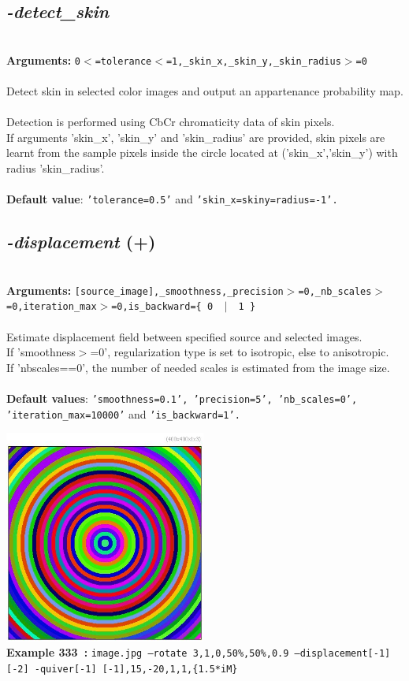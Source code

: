 \documentclass[a4paper,11pt,twoside]{book}
\begin{document}
\subsection{\emph{-detect\_skin} }\vspace*{-0.5em}
~\\\textbf{Arguments: } 
{\small \texttt{0$<$=tolerance$<$=1,\_skin\_x,\_skin\_y,\_skin\_radius$>$=0}}\\~\\
Detect skin in selected color images and output an appartenance probability map.
~\\Detection is performed using CbCr chromaticity data of skin pixels.
~\\If arguments 'skin\_x', 'skin\_y' and 'skin\_radius' are provided, skin pixels are learnt
from the sample pixels inside the circle located at ('skin\_x','skin\_y') with radius 'skin\_radius'.
~\\~\\\textbf{Default value}: {\small \texttt{'tolerance=0.5'} and \texttt{'skin\_x=skiny=radius=-1'.}}


\subsection{\emph{-displacement} (+)}\vspace*{-0.5em}
~\\\textbf{Arguments: } 
{\small \texttt{[source\_image],\_smoothness,\_precision$>$=0,\_nb\_scales$>$=0,iteration\_max$>$=0,is\_backward=\{ 0 ~$|$~ 1 \}}}\\~\\
Estimate displacement field between specified source and selected images.
~\\If 'smoothness$>$=0', regularization type is set to isotropic, else to anisotropic.
~\\If 'nbscales==0', the number of needed scales is estimated from the image size.
~\\~\\\textbf{Default values}: {\small \texttt{'smoothness=0.1', 'precision=5', 'nb\_scales=0', 'iteration\_max=10000'} and \texttt{'is\_backward=1'.}}
\begin{center}\includegraphics[keepaspectratio=true,height=7cm,width=\textwidth]{img/gmic_def333.jpg}\\
{\footnotesize \textbf{Example 333~:} \texttt{image.jpg --rotate 3,1,0,50\%,50\%,0.9 --displacement[-1] [-2] -quiver[-1] [-1],15,-20,1,1,\{1.5*iM\}}}
\end{center}
\end{document}
